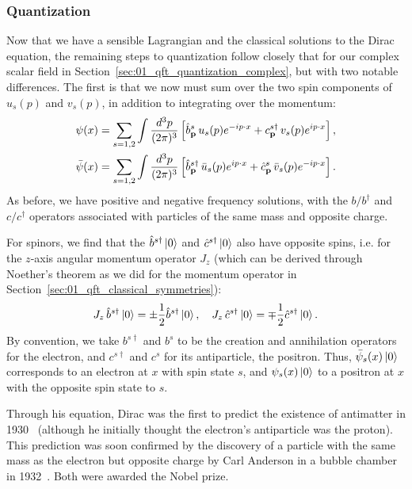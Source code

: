 \subsubsection{Quantization}

Now that we have a sensible Lagrangian and the classical solutions to the Dirac equation, the remaining steps to quantization follow closely that for our complex scalar field in Section~\ref{sec:01_qft_quantization_complex}, but with two notable differences.
The first is that we now must sum over the two spin components of $u_s(p)$ and $v_s(p)$, in addition to integrating over the momentum:
\begin{equation}
	\label{eq:01_qft_spinors_quantization}
	\begin{split}
		\psi(x) &= \sum_{s = 1, 2} \int \frac{d^3p}{(2\pi)^3} \left[\hat b^s_{\mathbf{p}}\, u_s(p) e^{-ip\cdot x} + c^{s\dagger}_{\mathbf{p}}\, v_s(p) e^{ip\cdot x}\right], \\
		\bar\psi(x) &= \sum_{s = 1, 2} \int \frac{d^3p}{(2\pi)^3} \left[\hat b^{s\dagger}_{\mathbf{p}}\, \bar{u}_s(p) e^{ip\cdot x} + \hat c^s_{\mathbf{p}}\,  \bar{v}_s(p) e^{-ip\cdot x}\right].
	\end{split}
\end{equation}
As before, we have positive and negative frequency solutions, with the $b/b^\dagger$ and $c/c^\dagger$ operators associated with particles of the same mass and opposite charge.

For spinors, we find that the $\hat b^{s\dagger} \ket{0}$ and $\hat c^{s\dagger} \ket{0}$ also have opposite spins, i.e. for the $z$-axis angular momentum operator $J_z$ (which can be derived through Noether's theorem as we did for the momentum operator in Section~\ref{sec:01_qft_classical_symmetries}):
\begin{equation}
	\label{eq:01_qft_spinors_spin_z}
	J_z\, \hat b^{s\dagger} \ket{0} = \pm\frac{1}{2} \hat b^{s\dagger} \ket{0}, \quad J_z\, \hat c^{s\dagger}\ket{0} = \mp \frac{1}{2} \hat c^{s\dagger}\ket{0}.
\end{equation}
By convention, we take $b^{s\dagger}$ and $b^s$ to be the creation and annihilation operators for the electron, and $c^{s\dagger}$ and $c^s$ for its antiparticle, the positron.
Thus, $\bar\psi_s(x)\ket{0}$ corresponds to an electron at $x$ with spin state $s$, and $\psi_s(x)\ket{0}$ to a positron at $x$ with the opposite spin state to $s$.

Through his equation, Dirac was the first to predict the existence of antimatter in 1930~\cite{Dirac:1930ek} (although he initially thought the electron's antiparticle was the proton).
This prediction was soon confirmed by the discovery of a particle with the same mass as the electron but opposite charge by Carl Anderson in a bubble chamber in 1932~\cite{Anderson:1932zz}.
Both were awarded the Nobel prize.

